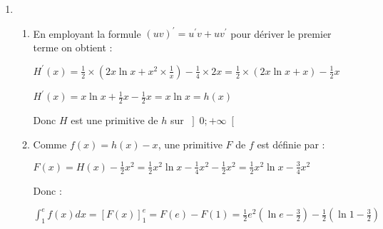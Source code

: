 \begin{corrige}
\begin{enumerate}
\begin{enumerate}[label=\alph*.]
               Sur $\left]0; +\infty \right[$, $f$ est de la forme $uv$ avec $u\left(x\right)=x$ et $v\left(x\right)=\ln x-1$ donc :
               \par
               $f^{\prime}\left(x\right)=u^{\prime}\left(x\right)v\left(x\right)+u\left(x\right)v^{\prime}\left(x\right)=1\times \left(\ln x-1\right)+x\times \frac{1}{x}=\ln x$
               \item
               La fonction logarithme népérien est strictement négative sur $\left]0; 1\right[$ et  strictement positive sur $\left]1; +\infty \right[$.
               \par
               $f\left(1\right)=1\times \left(\ln1-1\right)=-1$
               \par
               Le tableau de variations de $f$ sur $\left]0 ; +\infty \right[$ est donc :
               <img src="/wp-content/uploads/t_6b461ea5b9ecf7ef9c477f36fb335d4e.gif" alt="" class="aligncenter size-full  img-pc" />
          \end{enumerate}
          \item
          \begin{enumerate}[label=\alph*.]
               \item
               En employant la formule $\left(uv\right)^{\prime}=u^{\prime}v+uv^{\prime}$ pour dériver le premier terme on obtient :
               \par
               $H^{\prime}\left(x\right)=\frac{1}{2}\times \left(2x \ln x +x^{2}\times \frac{1}{x}\right)-\frac{1}{4}\times 2x=\frac{1}{2}\times \left(2x\ln x+x\right)-\frac{1}{2}x$
               \par
               $H^{\prime}\left(x\right)=x\ln x+\frac{1}{2}x-\frac{1}{2}x=x\ln x=h\left(x\right)$
               \par
               Donc $H$ est une primitive de $h$ sur $\left]0; +\infty \right[$
               \item
               Comme $f\left(x\right)=h\left(x\right)-x$, une primitive $F$ de $f$ est définie par :
               \par
               $F\left(x\right)=H\left(x\right)-\frac{1}{2}x^{2}=\frac{1}{2}x^{2} \ln x-\frac{1}{4} x^{2}-\frac{1}{2}x^{2}=\frac{1}{2}x^{2} \ln x-\frac{3}{4} x^{2}$
               \par
               Donc :
               \par
               $\int_{1}^{e}f\left(x\right)dx=\left[F\left(x\right)\right]_{1}^{e}=F\left(e\right)-F\left(1\right)=\frac{1}{2}e^{2}\left(\ln e-\frac{3}{2}\right)-\frac{1}{2}\left(\ln 1-\frac{3}{2}\right)$

\end{enumerate}
\end{enumerate}
\end{corrige}

